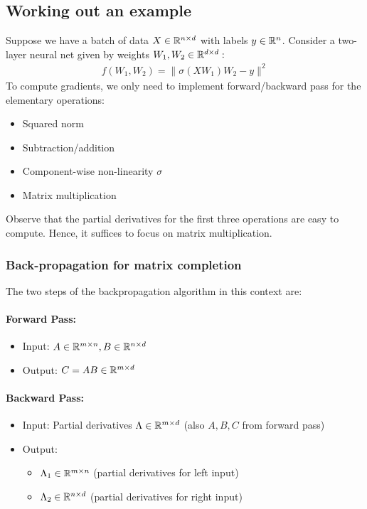 \subsection{Working out an example}
Suppose we have a batch of data $X \in \mathbb{R}^{n \times d}$ with labels $y \in \mathbb{R}^n$. Consider a two-layer neural net given by weights $W_1, W_2 \in \mathbb{R}^{d \times d}: $
\begin{align*}
f(W_1,W_2) = \|\sigma(XW_1)W_2 -y\|^2
\end{align*}
To compute gradients, we only need to implement forward/backward pass for the elementary operations:
\begin{itemize}
\item Squared norm
\item Subtraction/addition
\item Component-wise non-linearity $\sigma$
\item Matrix multiplication
\end{itemize}
Observe that the partial derivatives for the first three operations are easy to compute. Hence, it suffices to focus on matrix multiplication. 

\subsubsection*{Back-propagation for matrix completion}
The two steps of the backpropagation algorithm in this context are:

\paragraph{Forward Pass:}

\begin{itemize}
\item Input: $A \in \mathbb{R}^{m \times n}, B \in \mathbb{R}^{n \times d}$
\item Output: $C = AB \in \mathbb{R}^{m \times d}$
\end{itemize}

\paragraph{Backward Pass:}
\begin{itemize}
\item Input: Partial derivatives $\Lambda \in \mathbb{R}^{m \times d}$ (also $A,B,C$ from forward pass)
\item Output:
 \begin{itemize}
\item $\Lambda_1 \in \mathbb{R}^{m \times n}$ (partial derivatives for left input)
\item $\Lambda_2 \in \mathbb{R}^{n \times d}$ (partial  derivatives for right input)
\end{itemize}
\end{itemize}


